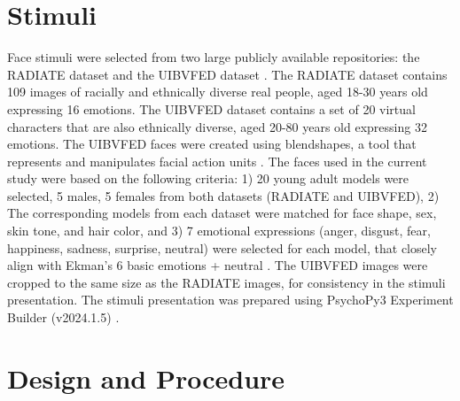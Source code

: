 \section{Stimuli}
Face stimuli were selected from two large publicly available repositories: the RADIATE dataset \citep{conley_racially_2018} and the UIBVFED dataset \citep{oliver_uibvfed_2020}. 
The RADIATE dataset contains 109 images of racially and ethnically diverse real people, aged 18-30 years old expressing 16 emotions. 
The UIBVFED dataset contains a set of 20 virtual characters that are also ethnically diverse, aged 20-80 years old expressing 32 emotions.
The UIBVFED faces were created \citep{oliver_uibvfed_2020} using blendshapes, a tool that represents and manipulates facial action units \citep{ekman1978facial}. 
The faces used in the current study were based on the following criteria: 
1) 20 young adult models were selected, 5 males, 5 females from both datasets (RADIATE and UIBVFED), 
2) The corresponding models from each dataset were matched for face shape, sex, skin tone, and hair color, and
3) 7 emotional expressions (anger, disgust, fear, happiness, sadness, surprise, neutral) were selected for each model, that closely align with Ekman's 6 basic emotions + neutral \citep{ekman_are_1992}.
The UIBVFED images were cropped to the same size as the RADIATE images, for consistency in the stimuli presentation.
The stimuli presentation was prepared using PsychoPy3 Experiment Builder (v2024.1.5) \citep{peirce_psychopy2_2019}. 

\section{Design and Procedure}
